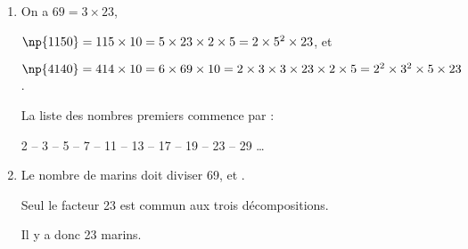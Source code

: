
\medskip
	
\begin{enumerate}
\item On a $69 = 3 \times 23$,\: 

$\np{1150} = 115 \times 10 = 5 \times 23  \times 2 \times 5 = 2 \times 5^2 \times 23$,
et 

$\np{4140} = 414 \times 10 = 6 \times 69 \times 10 = 2 \times 3 \times 3 \times 23 \times 2 \times 5 = 2^2 \times 3^2 \times 5 \times 23$.

La liste des nombres premiers commence par :

2 – 3 – 5 – 7 – 11 – 13 – 17 – 19 – 23 – 29 …
\item  Le nombre de marins doit diviser 69,  et .

Seul le facteur 23 est commun aux trois décompositions.

Il y a donc 23 marins.
\end{enumerate}

\bigskip

